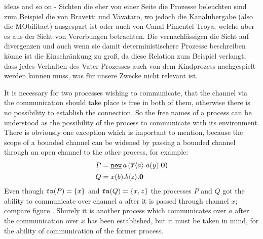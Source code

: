 \begin{old}{ideas and so on}
- Sichten die eher von einer Seite die Prozesse beleuchten sind zum Beispiel die von Bravetti und Vavataro, wo jedoch die Kanalübergabe (also die MObilitaet) ausgespart ist oder auch von Canal Pimentel Troya, welche aber es aus der Sicht von Vererbungen betrachten. Die vernachlässigen die Sicht auf divergenzen und auch wenn sie damit deterministischere Prozesse beschreiben könne ist die Einschränkung zu groß, da diese Relation zum Beispiel verlangt, dass jedes Verhalten des Vater Prozesses auch von dem Kindprozess nachgespielt werden können muss, was für unsere Zwecke nicht relevant ist.




It is necessary for two processes wishing to communicate, that the channel via the communication should take place is free in both of them, otherwise there is no possibility to establish the connection. So the free names of a process can be understood as the possibility of the process to communicate with its environment. There is obviously one exception which is important to mention, because the scope of a bounded channel can be widened by passing a bounded channel through an open channel to the other process, for example:
\begin{align*}
	P &= \procres[a]{a}{\out{x}{a}.\inp{a}{y}.\proczero} \\
	Q &= \inp{x}{b}.\out{b}{z}.\proczero \\
\end{align*}
Even though $\fn{P}=\set{x}$ and $\fn{Q}=\set{x,z}$ the processes $P$ and $Q$ got the ability to communicate over channel $a$ after it is passed through channel $x$; compare figure . Shurely it is another process which communicates over $a$ after the communication over $x$ has been established, but it must be taken in mind, for the ability of communication of the former process.


\end{old}
